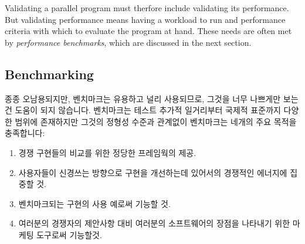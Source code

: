 Validating a parallel program must therfore include validating its
performance.
But validating performance means having a workload to run and performance
criteria with which to evaluate the program at hand.
These needs are often met by \emph{performance benchmarks}, which
are discussed in the next section.

\fi

\subsection{Benchmarking}
\label{sec:debugging:Benchmarking}

종종 오남용되지만, 벤치마크는 유용하고 널리 사용되므로, 그것을 너무 나쁘게만
보는건 도움이 되지 않습니다.
벤치마크는 테스트 추가적 일거리부터 국제적 표준까지 다양한 범위에 존재하지만
그것의 정형성 수준과 관계없이 벤치마크는 네개의 주요 목적을 충족합니다:

\begin{enumerate}
\item	경쟁 구현들의 비교를 위한 정당한 프레임웍의 제공.
\item	사용자들이 신경쓰는 방향으로 구현을 개선하는데 있어서의 경쟁적인
	에너지에 집중할 것.
\item	벤치마크되는 구현의 사용 예로써 기능할 것.
\item	여러분의 경쟁자의 제안사항 대비 여러분의 소프트웨어의 장점을 나타내기
	위한 마케팅 도구로써 기능할것.

\end{enumerate}

